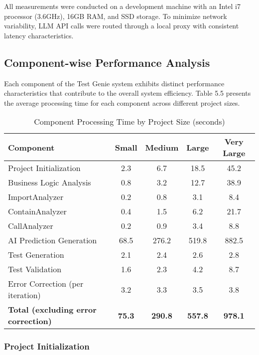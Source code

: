 All measurements were conducted on a development machine with an Intel i7 processor (3.6GHz), 16GB RAM, and SSD storage. To minimize network variability, LLM API calls were routed through a local proxy with consistent latency characteristics.

\subsection{Component-wise Performance Analysis}

Each component of the Test Genie system exhibits distinct performance characteristics that contribute to the overall system efficiency. Table 5.5 presents the average processing time for each component across different project sizes.

\begin{table}[ht]
    \centering
    \caption{Component Processing Time by Project Size (seconds)}
    \begin{tabular}{lcccc}
        \hline
        \textbf{Component} & \textbf{Small} & \textbf{Medium} & \textbf{Large} & \textbf{Very Large} \\ \hline
        Project Initialization & 2.3 & 6.7 & 18.5 & 45.2 \\
        Business Logic Analysis & 0.8 & 3.2 & 12.7 & 38.9 \\
        \quad ImportAnalyzer & 0.2 & 0.8 & 3.1 & 8.4 \\
        \quad ContainAnalyzer & 0.4 & 1.5 & 6.2 & 21.7 \\
        \quad CallAnalyzer & 0.2 & 0.9 & 3.4 & 8.8 \\
        AI Prediction Generation & 68.5 & 276.2 & 519.8 & 882.5 \\
        Test Generation & 2.1 & 2.4 & 2.6 & 2.8 \\
        Test Validation & 1.6 & 2.3 & 4.2 & 8.7 \\
        Error Correction (per iteration) & 3.2 & 3.3 & 3.5 & 3.8 \\
        \hline
        \textbf{Total (excluding error correction)} & \textbf{75.3} & \textbf{290.8} & \textbf{557.8} & \textbf{978.1} \\ \hline
    \end{tabular}
\end{table}

\subsubsection{Project Initialization}

